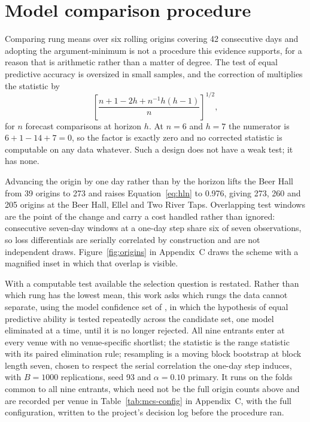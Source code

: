 \section{Model comparison procedure}
\label{sec:selection}

Comparing rung means over six rolling origins covering 42 consecutive days and adopting the
argument-minimum is not a procedure this evidence supports, for a reason that is arithmetic
rather than a matter of degree. The \citet{diebold_comparing_1995} test of equal predictive
accuracy is oversized in small samples, and the correction of \citet{harvey_testing_1997}
multiplies the statistic by
\begin{equation}
\left[\frac{n + 1 - 2h + n^{-1}h(h-1)}{n}\right]^{1/2},
\label{eq:hln}
\end{equation}
for $n$ forecast comparisons at horizon $h$. At $n = 6$ and $h = 7$ the numerator is
$6 + 1 - 14 + 7 = 0$, so the factor is exactly zero and no corrected statistic is computable on
any data whatever. Such a design does not have a weak test; it has none.

Advancing the origin by one day rather than by the horizon lifts the Beer Hall from 39 origins to
273 and raises Equation~\ref{eq:hln} to 0.976, giving 273, 260 and 205 origins at the Beer Hall,
Ellel and Two River Taps. Overlapping test windows are the point of the change and carry a cost
handled rather than ignored: consecutive seven-day windows at a one-day step share six of seven
observations, so loss differentials are serially correlated by construction and are not
independent draws. Figure~\ref{fig:origins} in Appendix~C draws the scheme with a magnified inset
in which that overlap is visible.

\label{sec:mcs}
With a computable test available the selection question is restated. Rather than which rung has
the lowest mean, this work asks which rungs the data cannot separate, using the model confidence
set of \citet{hansen_model_2011}, in which the hypothesis of equal predictive ability is tested
repeatedly across the candidate set, one model eliminated at a time, until it is no longer
rejected. All nine entrants enter at every venue with no venue-specific shortlist; the statistic
is the range statistic with its paired elimination rule; resampling is a moving block bootstrap at
block length seven, chosen to respect the serial correlation the one-day step induces, with
$B = 1000$ replications, seed 93 and $\alpha = 0.10$ primary. It runs on the folds common to all
nine entrants, which need not be the full origin counts above and are recorded per venue in
Table~\ref{tab:mcs-config} in Appendix~C, with the full configuration, written to the project's
decision log before the procedure ran.

